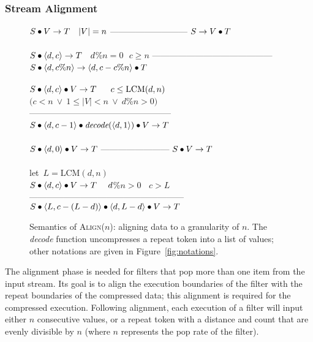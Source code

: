 \subsubsection{Stream Alignment}

\begin{figure}[t]
$S \bullet V \rightarrow T~~~|V|=n$\skiptopb
---------------------------\skipbot
$S \rightarrow V \bullet T$
~ \\ ~ \\
$S \bullet \langle d, c\rangle \rightarrow T~~~d$\%$n=0~~~c \ge n$\skiptopb
------------------------------------------\skipbot
$S \concat \tup{d}{c$\%$n} \rightarrow \tup{d}{c-c$\%$n} \concat T$
~ \\ ~ \\
$S \bullet \langle d, c\rangle \bullet V \rightarrow T~~~~~c\le\mbox{LCM}(d,n)$\\
$(c<n~\vee~1 \le |V|<n~\vee~d$\%$n>0)$\skiptopb
--------------------------------------------------\skipbot
$S \bullet \langle d, c-1\rangle \bullet \mbox{\it decode}(\langle d, 1\rangle) \bullet V \rightarrow T$
~ \\ ~ \\
$S \bullet \langle d, 0\rangle \bullet V \rightarrow T$\skiptopb
------------------------\skipbot
$S \bullet V \rightarrow T$
~ \\ ~ \\
let~$L=\mbox{LCM}(d,n)$\\
$S \bullet \langle d, c\rangle \bullet V \rightarrow T~~~~d$\%$n > 0~~~~c > L$\vspace{-3pt}\skiptopa
------------------------------------------------------\skipbot
$S \bullet \langle L, c-(L-d)\rangle \bullet \langle d, L-d\rangle \bullet V \rightarrow T$
\caption{Semantics of \textsc{Align}($n$): aligning data
to a granularity of $n$.  The \mbox{\it decode} function uncompresses
a repeat token into a list of values; other notations are given in
Figure~\ref{fig:notations}. \protect\label{fig:stream-align}}
\end{figure}

The alignment phase is needed for filters that pop more than one item
from the input stream.  Its goal is to align the execution boundaries
of the filter with the repeat boundaries of the compressed data; this
alignment is required for the compressed execution.  Following
alignment, each execution of a filter will input either $n$
consecutive values, or a repeat token with a distance and count that
are evenly divisible by $n$ (where $n$ represents the pop rate of the
filter).

